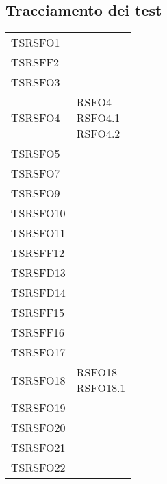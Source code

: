 {\begin{center}
	\end{center}
\def\tabularxcolumn#1{m{#1}}
{
	
\subsection{Tracciamento dei test}\label{SpecificaDeiTestTestDiSistemaTracciamentoDeiTest}
	
	\begin{center}
		\renewcommand{\arraystretch}{1.4}
		\begin{longtable}{|p{3cm}|p{3cm}|}
			\hline
			\rowcolor{airforceblue}
			\makecell[c]{\textbf{Id Test}} & \makecell[c]{\textbf{Id Requisito}} \\
			\hline
			\hline
			TSRSFO1	& \makecell{RSFO1} \\
			\hline
			TSRSFF2 & \makecell{RSFF2} \\
			\hline
			TSRSFO3 & \makecell{RSFO3}  \\
			\hline
			TSRSFO4 & \makecell{RSFO4 \\ RSFO4.1 \\ RSFO4.2} \\
			\hline
			TSRSFO5 & \makecell{RSFO5} \\
			\hline
			TSRSFO7 & \makecell{RSFO7} \\
			\hline
			TSRSFO9 & \makecell{RSFO9} \\
			\hline
			TSRSFO10 & \makecell{RSFO10} \\
			\hline
			TSRSFO11 & \makecell{RSFO11} \\
			\hline
			TSRSFF12 & \makecell{RSFF12} \\
			\hline
			TSRSFD13 & \makecell{RSFD13} \\
			\hline
			TSRSFD14 & \makecell{RSFD14} \\
			\hline
			TSRSFF15 & \makecell{RSFF15} \\
			\hline
			TSRSFF16 & \makecell{RSFF16} \\
			\hline
			TSRSFO17 & \makecell{RSFO17} \\
			\hline
			TSRSFO18 & \makecell{RSFO18 \\ RSFO18.1 }\\
			\hline
			TSRSFO19 & \makecell{RSFO19} \\
			\hline
			TSRSFO20 & \makecell{RSFO20} \\
			\hline
			TSRSFO21 & \makecell{RSFO21} \\
			\hline
			TSRSFO22 & \makecell{RSFO22} \\

\end{longtable}
\end{center}}}
